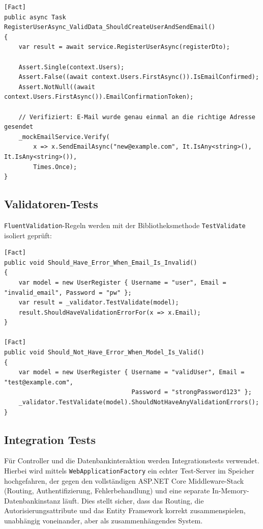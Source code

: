 \begin{lstlisting}[language={[Sharp]C}, caption={Unit Test: Registrierung erstellt Nutzer und sendet E-Mail}]
[Fact]
public async Task RegisterUserAsync_ValidData_ShouldCreateUserAndSendEmail()
{
    var result = await service.RegisterUserAsync(registerDto);

    Assert.Single(context.Users);
    Assert.False((await context.Users.FirstAsync()).IsEmailConfirmed);
    Assert.NotNull((await context.Users.FirstAsync()).EmailConfirmationToken);

    // Verifiziert: E-Mail wurde genau einmal an die richtige Adresse gesendet
    _mockEmailService.Verify(
        x => x.SendEmailAsync("new@example.com", It.IsAny<string>(), It.IsAny<string>()),
        Times.Once);
}
\end{lstlisting}

\newpage
\subsection{Validatoren-Tests}
\texttt{FluentValidation}-Regeln werden mit der Bibliotheksmethode \texttt{TestValidate} isoliert geprüft:

\begin{lstlisting}[language={[Sharp]C}, caption={Validator-Tests mit FluentValidation.TestHelper}]
[Fact]
public void Should_Have_Error_When_Email_Is_Invalid()
{
    var model = new UserRegister { Username = "user", Email = "invalid_email", Password = "pw" };
    var result = _validator.TestValidate(model);
    result.ShouldHaveValidationErrorFor(x => x.Email);
}

[Fact]
public void Should_Not_Have_Error_When_Model_Is_Valid()
{
    var model = new UserRegister { Username = "validUser", Email = "test@example.com",
                                   Password = "strongPassword123" };
    _validator.TestValidate(model).ShouldNotHaveAnyValidationErrors();
}
\end{lstlisting}

\subsection{Integration Tests}
Für Controller und die Datenbankinteraktion werden Integrationstests verwendet. Hierbei wird mittels \texttt{WebApplicationFactory} ein echter Test-Server im Speicher hochgefahren, der gegen den vollständigen ASP.NET Core Middleware-Stack (Routing, Authentifizierung, Fehlerbehandlung) und eine separate In-Memory-Datenbankinstanz läuft. Dies stellt sicher, dass das Routing, die Autorisierungsattribute und das Entity Framework korrekt zusammenspielen, unabhängig voneinander, aber als zusammenhängendes System.
